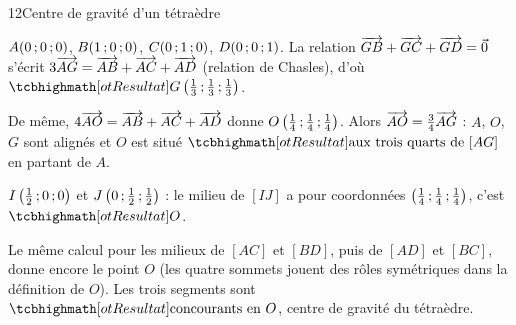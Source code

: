 \begin{corrige}{12}{Centre de gravité d'un tétraèdre}
\begin{questions}
  \item $A(0\,{;}\,0\,{;}\,0)$, $B(1\,{;}\,0\,{;}\,0)$, $C(0\,{;}\,1\,{;}\,0)$, $D(0\,{;}\,0\,{;}\,1)$. La relation $\overrightarrow{GB}+\overrightarrow{GC}+\overrightarrow{GD}=\vec0$ s'écrit
    $3\overrightarrow{AG}=\overrightarrow{AB}+\overrightarrow{AC}+\overrightarrow{AD}$ (relation de Chasles), d'où $\res{G\left(\tfrac13\pv\tfrac13\pv\tfrac13\right)}$.
  \item De même, $4\overrightarrow{AO}=\overrightarrow{AB}+\overrightarrow{AC}+\overrightarrow{AD}$ donne $O\left(\frac14\,{;}\,\frac14\,{;}\,\frac14\right)$. Alors
    $\overrightarrow{AO}=\frac34\overrightarrow{AG}$ : $A$, $O$, $G$ sont alignés et $O$ est situé $\res{\text{aux trois quarts de }[AG]}$ en partant de $A$.
  \item $I\left(\frac12\,{;}\,0\,{;}\,0\right)$ et $J\left(0\,{;}\,\frac12\,{;}\,\frac12\right)$ : le milieu de $[IJ]$ a pour coordonnées
    $\left(\frac14\,{;}\,\frac14\,{;}\,\frac14\right)$, c'est $\res{O}$.
  \item Le même calcul pour les milieux de $[AC]$ et $[BD]$, puis de $[AD]$ et $[BC]$, donne encore le point $O$ (les quatre sommets
    jouent des rôles symétriques dans la définition de $O$). Les trois segments sont $\res{\text{concourants en }O}$, centre de gravité
    du tétraèdre.
\end{questions}
\end{corrige}

